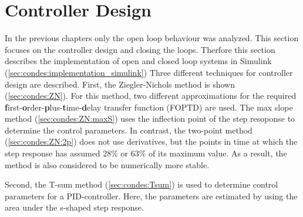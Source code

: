 \section{Controller Design} \label{sec:condes}

In the previous chapters only the open loop behaviour was analyzed.
This section focuses on the controller design and closing the loops.
Therfore this section describes the implementation of open and closed loop systems in Simulink (\autoref{sec:condes:implementation_simulink})
Three different techniques for controller design are described.
First, the Ziegler-Nichols method is shown (\autoref{sec:condes:ZN}).
For this method, two different approximations for the required \textbf{f}irst-\textbf{o}rder-\textbf{p}lus-\textbf{t}ime-\textbf{d}elay transfer function (FOPTD) are used.
The max slope method (\autoref{sec:condes:ZN:maxS}) uses the inflection point of the step resoponse to determine the control parameters.
In contrast, the two-point method (\autoref{sec:condes:ZN:2p}) does not use derivatives, but the points in time at which the step response has assumed 28\% or 63\% of its maximum value.
As a result, the method is also considered to be numerically more stable.

Second, the T-sum method (\autoref{sec:condes:Tsum}) is used to determine control parameters for a PID-controller.
Here, the parameters are estimated by using the area under the s-shaped step response.

